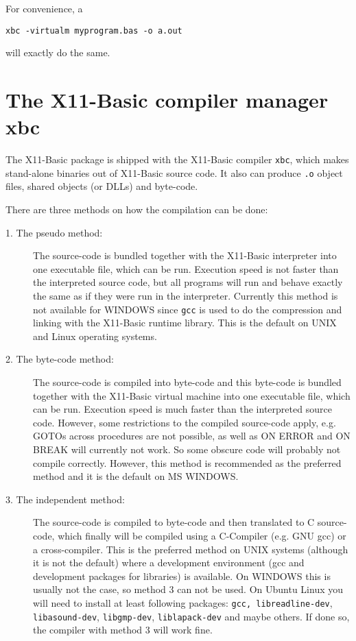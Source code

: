 For convenience, a
\begin{mdframed}[hidealllines=true,backgroundcolor=black!20]
\begin{verbatim}
xbc -virtualm myprogram.bas -o a.out
\end{verbatim}
\end{mdframed}
will exactly do the same. 
  
\section{The X11-Basic compiler manager {\bf xbc}}

The X11-Basic package is shipped with the X11-Basic compiler \verb|xbc|, which
makes stand-alone binaries out of X11-Basic source code. It also can produce
\verb|.o| object files, shared objects (or DLLs) and byte-code. 

There are three methods on how the compilation can be done:
\begin{description}
\item[1. The pseudo method:] The source-code is bundled together with the
X11-Basic interpreter into one executable file, which can be run. Execution
speed is not faster than the interpreted source code, but all programs will run
and behave exactly the same as if they were run in the interpreter. Currently
this method is not available for WINDOWS since \verb|gcc| is used to do the
compression and linking with the X11-Basic runtime library. This is the default 
on UNIX and Linux operating systems.
\item[2. The byte-code method:] The source-code is compiled into byte-code and this
byte-code is bundled together with the X11-Basic virtual machine into one
executable file, which can be run. Execution speed is much faster than the
interpreted source code. However,
some restrictions to the compiled source-code apply, e.g. GOTOs across procedures
are not possible, as well as ON ERROR and ON BREAK will currently not work. So some
obscure code will probably not compile correctly. However, this method is
recommended as the preferred method and it is the default on MS WINDOWS.
\item[3. The independent method:] The source-code is compiled to byte-code and
then translated to C source-code, which finally will be compiled using a
C-Compiler (e.g. GNU gcc) or a cross-compiler. This is the preferred method on
UNIX systems (although it is not the default) where a development environment
(gcc and development packages for libraries) is available. On WINDOWS this is
usually not the case, so method 3 can not be used. On Ubuntu Linux you will need
to install at least following packages:  
\verb|gcc, libreadline-dev|, \verb|libasound-dev|, \verb|libgmp-dev|,  \verb|liblapack-dev|
and maybe others. If done so, the compiler with method 3 will work fine.
\end{description}

